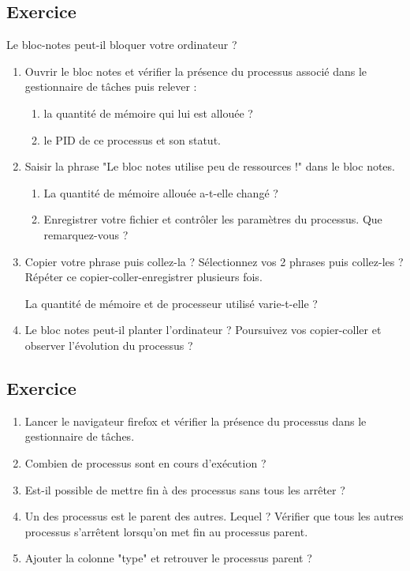 \documentclass[11pt,a4paper]{article}
\newcounter{numexo}
\begin{document}
\subsection*{\Large Exercice \thenumexo}
Le bloc-notes peut-il bloquer votre ordinateur ?
\begin{enumerate}
\item Ouvrir le bloc notes et vérifier la présence du processus associé dans le gestionnaire de tâches puis relever :
\begin{enumerate}
\item la quantité de mémoire qui lui est allouée ?
\item le PID de ce processus et son statut.
\end{enumerate}
\item Saisir la phrase "Le bloc notes utilise peu de ressources !" dans le bloc notes.
\begin{enumerate}
\item La quantité de mémoire allouée a-t-elle changé ?
\item Enregistrer votre fichier et contrôler les paramètres du processus. Que remarquez-vous ?
\end{enumerate}
\item Copier votre phrase puis collez-la ? Sélectionnez vos 2 phrases puis collez-les ? Répéter ce copier-coller-enregistrer plusieurs fois.

La quantité de mémoire et de processeur utilisé varie-t-elle ?
\item Le bloc notes peut-il planter l'ordinateur ? Poursuivez vos copier-coller et observer l'évolution du processus ?
\end{enumerate} 



\addtocounter{numexo}{1}
\subsection*{\Large Exercice \thenumexo}
\begin{enumerate}
\item Lancer le navigateur firefox et vérifier la présence du processus dans le gestionnaire de tâches.
\item Combien de processus sont en cours d'exécution ?
\item Est-il possible de mettre fin à des processus sans tous les arrêter ?
\item Un des processus est le parent des autres. Lequel ? Vérifier que tous les autres processus s'arrêtent lorsqu'on met fin au processus parent.
\item Ajouter la colonne "type" et retrouver le processus parent ?
\end{enumerate}
\end{document}
